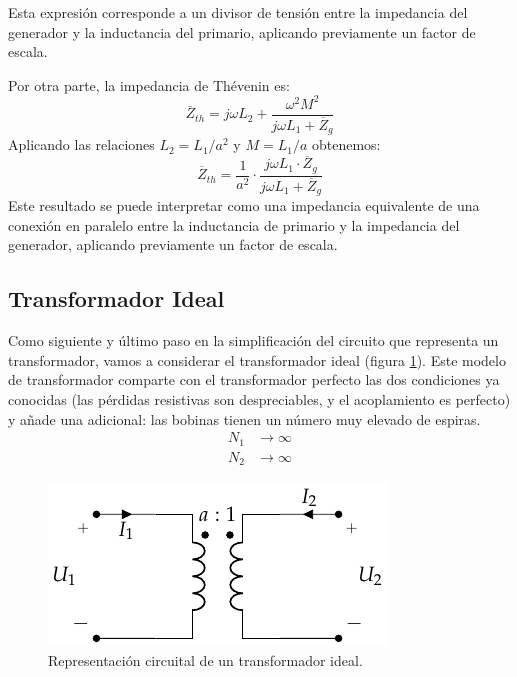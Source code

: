 Esta expresión corresponde a un divisor de tensión entre la impedancia
del generador y la inductancia del primario, aplicando previamente un
factor de escala.

Por otra parte, la impedancia de Thévenin es:
\[
  \overline{Z}_{th} = j\omega L_2 + \frac{\omega^2 M^2}{j\omega L_1 +
    \overline{Z}_g}
\]
Aplicando las relaciones $L_2 = L_1/a^2$ y $M = L_1/a$ obtenemos:
\begin{equation}
  \label{eq:trafo-perfecto-impedancia-thevenin}
  \overline{Z}_{th} = \frac{1}{a^2} \cdot \frac{j \omega L_1 \cdot \overline{Z}_g}{j\omega L_1 + \overline{Z}_g}
\end{equation}
Este resultado se puede interpretar como una impedancia equivalente de
una conexión en paralelo entre la inductancia de primario y la
impedancia del generador, aplicando previamente un factor de escala.


\subsection{Transformador Ideal}
\label{sec:trafo-ideal}

Como siguiente y último paso en la simplificación del circuito que
representa un transformador, vamos a considerar el transformador ideal
(figura \ref{fig:trafo-ideal}). Este modelo de transformador comparte
con el transformador perfecto las dos condiciones ya conocidas (las
pérdidas resistivas son despreciables, y el acoplamiento es perfecto)
y añade una adicional: las bobinas tienen un número muy elevado de
espiras.
  \begin{align*}
  N_1 &\to \infty\\
  N_2 &\to \infty
  \end{align*}

  \begin{figure}
    \centering
    \includegraphics[height=0.15\textheight]{../figs/Trafo_Ideal.pdf}
    \caption{Representación circuital de un transformador ideal.}
    \label{fig:trafo-ideal}
  \end{figure}

